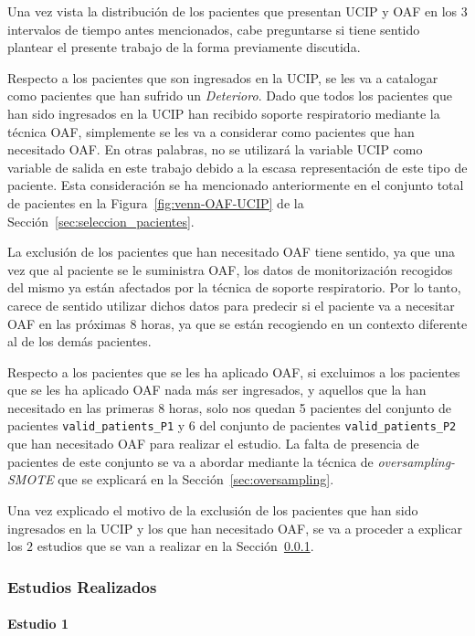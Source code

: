 Una vez vista la distribución de los pacientes que presentan UCIP y OAF en los $3$ intervalos de tiempo antes mencionados, cabe preguntarse si tiene sentido plantear el presente trabajo de la forma previamente discutida.

Respecto a los pacientes que son ingresados en la UCIP, se les va a catalogar como pacientes que han sufrido un \textit{Deterioro}. Dado que todos los pacientes que han sido ingresados en la UCIP han recibido soporte respiratorio mediante la técnica OAF, simplemente se les va a considerar como pacientes que han necesitado OAF. En otras palabras, no se utilizará la variable UCIP como variable de salida en este trabajo debido a la escasa representación de este tipo de paciente. Esta consideración se ha mencionado anteriormente en el conjunto total de pacientes en la Figura~\ref{fig:venn-OAF-UCIP} de la Sección~\ref{sec:seleccion_pacientes}.

La exclusión de los pacientes que han necesitado OAF tiene sentido, ya que una vez que al paciente se le suministra OAF, los datos de monitorización recogidos del mismo ya están afectados por la técnica de soporte respiratorio. Por lo tanto, carece de sentido utilizar dichos datos para predecir si el paciente va a necesitar OAF en las próximas $8$ horas, ya que se están recogiendo en un contexto diferente al de los demás pacientes.

Respecto a los pacientes que se les ha aplicado OAF, si excluimos a los pacientes que se les ha aplicado OAF nada más ser ingresados, y aquellos que la han necesitado en las primeras $8$ horas, solo nos quedan 5 pacientes del conjunto de pacientes \texttt{valid\_patients\_P1} y 6 del conjunto de pacientes \texttt{valid\_patients\_P2} que han necesitado OAF para realizar el estudio. La falta de presencia de pacientes de este conjunto se va a abordar mediante la técnica de \textit{oversampling-SMOTE} que se explicará en la Sección~\ref{sec:oversampling}.

Una vez explicado el motivo de la exclusión de los pacientes que han sido ingresados en la UCIP y los que han necesitado OAF, se va a proceder a explicar los $2$ estudios que se van a realizar en la Sección~\ref{sec:estudios}.

\subsubsection{Estudios Realizados}\label{sec:estudios}

\paragraph{Estudio 1}\label{sec:estudio1}

